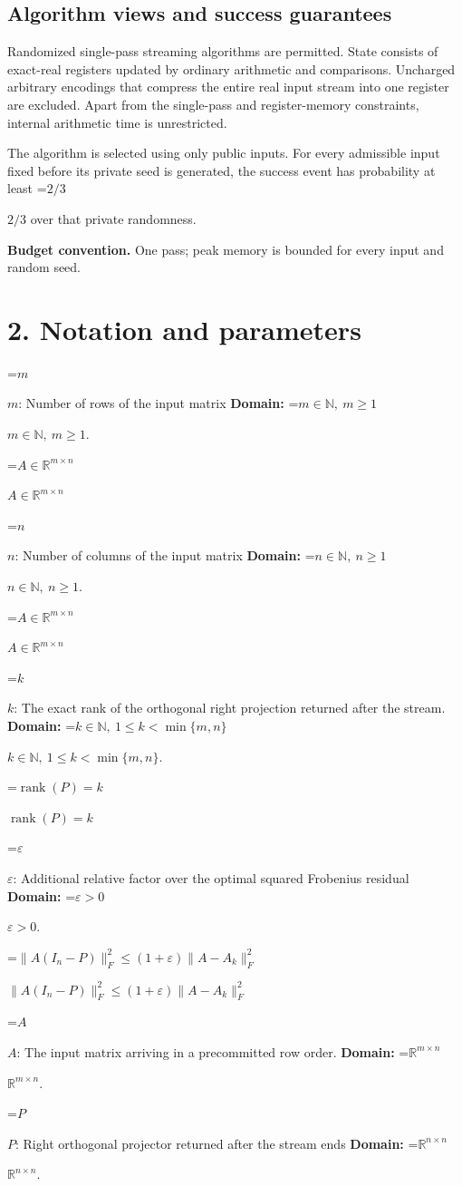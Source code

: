 \documentclass[10pt,a4paper]{article}
\newcommand{\AtlasMath}[1]{\par\begingroup\centering\setbox0=\hbox{$\displaystyle #1$}\ifdim\wd0>1.4\linewidth\typeout{ATLAS WIDE FORMULA: \the\wd0}\fi\ifdim\wd0>\linewidth\resizebox{\linewidth}{!}{\box0}\else\box0\fi\par\endgroup}
\newcommand{\AtlasInlineMath}[1]{\begingroup\setbox0=\hbox{$#1$}\ifdim\wd0>.4\linewidth\endgroup\AtlasMath{#1}\else\endgroup$#1$\fi}
\begin{document}
\subsection{Algorithm views and success guarantees}
Randomized single-pass streaming algorithms are permitted. State consists of exact-real registers updated by ordinary arithmetic and comparisons. Uncharged arbitrary encodings that compress the entire real input stream into one register are excluded. Apart from the single-pass and register-memory constraints, internal arithmetic time is unrestricted.

The algorithm is selected using only public inputs. For every admissible input fixed before its private seed is generated, the success event has probability at least \AtlasInlineMath{2/3} over that private randomness.

\textbf{Budget convention.} One pass; peak memory is bounded for every input and random seed.

\section{2. Notation and parameters}
\AtlasInlineMath{m}: Number of rows of the input matrix \textbf{Domain:} \AtlasInlineMath{m\in\mathbb N,\ m\ge1}.

\AtlasInlineMath{A\in\mathbb R^{m\times n}}

\AtlasInlineMath{n}: Number of columns of the input matrix \textbf{Domain:} \AtlasInlineMath{n\in\mathbb N,\ n\ge1}.

\AtlasInlineMath{A\in\mathbb R^{m\times n}}

\AtlasInlineMath{k}: The exact rank of the orthogonal right projection returned after the stream. \textbf{Domain:} \AtlasInlineMath{k\in\mathbb N,\ 1\le k<\min\{m,n\}}.

\AtlasInlineMath{\operatorname{rank}(P)=k}

\AtlasInlineMath{\varepsilon}: Additional relative factor over the optimal squared Frobenius residual \textbf{Domain:} \AtlasInlineMath{\varepsilon>0}.

\AtlasInlineMath{\|A(I_n-P)\|_F^2\le(1+\varepsilon)\|A-A_k\|_F^2}

\AtlasInlineMath{A}: The input matrix arriving in a precommitted row order. \textbf{Domain:} \AtlasInlineMath{\mathbb R^{m\times n}}.

\AtlasInlineMath{P}: Right orthogonal projector returned after the stream ends \textbf{Domain:} \AtlasInlineMath{\mathbb R^{n\times n}}.
\end{document}
